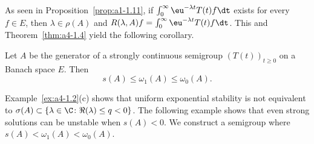 As seen in Proposition~\ref{prop:a1-1.11}, if\/ $\int_0^\infty \eu^{-\lambda t} T(t) f  \dt$ exists for every $f \in E$, then $\lambda \in \rho(A)$ and $R(\lambda, A) f = \int_0^\infty \eu^{-\lambda t} T(t) f  \dt$. 
This and Theorem~\ref{thm:a4-1.4} yield the following corollary.
\begin{corollary} \label{cor:a4-1.5}
Let $ A $ be the generator of a strongly continuous semigroup $ (T(t))_{t \geq 0} $ on a Banach space $ E $. 
Then  
\[
s(A) \leq \omega_1(A) \leq \omega_{0}(A).
\]
\end{corollary}
Example~\ref{ex:a4-1.2}(c) shows that uniform exponential stability is not equivalent to $ \sigma(A) \subset \{\lambda \in \C \colon \Re(\lambda) \leq q < 0 \} $. 
The following example shows that even strong solutions can be unstable when $ s(A) < 0 $. We construct a semigroup where $ s(A) < \omega_1(A) < \omega_{0}(A) $.
